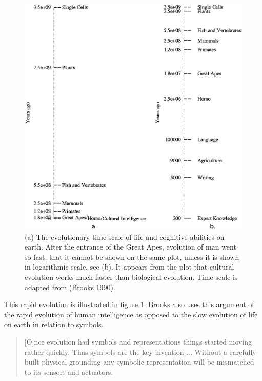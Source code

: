 \begin{figure}
\centerline{\includegraphics[width=12cm]{theory/evol.eps}}
\caption{(a) The evolutionary time-scale of life and cognitive abilities on earth. After the entrance of the Great Apes, evolution of man went so fast, that it cannot be shown on the same plot, unless it is shown in logarithmic scale, see (b). It appears from the plot that cultural evolution works much faster than biological evolution. Time-scale is adapted from (Brooks 1990).}
\label{f:theory:evolution}
\end{figure}


This rapid evolution is illustrated in figure \ref{f:theory:evolution}. Brooks also uses this argument of the rapid evolution of human intelligence as opposed to the slow evolution of life on earth in relation to symbols.

\begin{quote}
[O]nce evolution had symbols and representations things started moving rather quickly. Thus symbols are the key invention ... Without a carefully built physical grounding any symbolic representation will be mismatched to its sensors and actuators. \citep{brooks:1990}
\end{quote}


